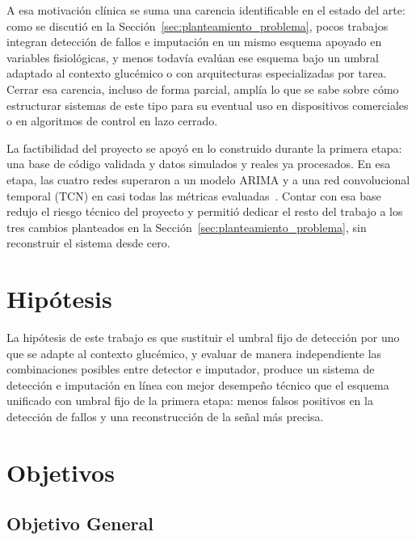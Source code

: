 \documentclass{report}
\begin{document}
A esa motivación clínica se suma una carencia identificable en el estado del arte: como se discutió en la Sección~\ref{sec:planteamiento_problema}, pocos trabajos integran detección de fallos e imputación en un mismo esquema apoyado en variables fisiológicas, y menos todavía evalúan ese esquema bajo un umbral adaptado al contexto glucémico o con arquitecturas especializadas por tarea. Cerrar esa carencia, incluso de forma parcial, amplía lo que se sabe sobre cómo estructurar sistemas de este tipo para su eventual uso en dispositivos comerciales o en algoritmos de control en lazo cerrado.

La factibilidad del proyecto se apoyó en lo construido durante la primera etapa: una base de código validada y datos simulados y reales ya procesados. En esa etapa, las cuatro redes superaron a un modelo ARIMA y a una red convolucional temporal (TCN) en casi todas las métricas evaluadas~\cite{sanchez2025imputation}. Contar con esa base redujo el riesgo técnico del proyecto y permitió dedicar el resto del trabajo a los tres cambios planteados en la Sección~\ref{sec:planteamiento_problema}, sin reconstruir el sistema desde cero.

\section{Hipótesis}
\label{sec:hipotesis}

La hipótesis de este trabajo es que sustituir el umbral fijo de detección por uno que se adapte al contexto glucémico, y evaluar de manera independiente las combinaciones posibles entre detector e imputador, produce un sistema de detección e imputación en línea con mejor desempeño técnico que el esquema unificado con umbral fijo de la primera etapa: menos falsos positivos en la detección de fallos y una reconstrucción de la señal más precisa.

\section{Objetivos}
\label{sec:objetivos}

\subsection{Objetivo General}
\label{subsec:objetivo_general}
\end{document}

